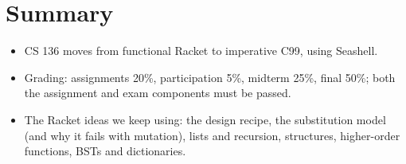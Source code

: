 \section{Summary}
\begin{itemize}
  \item CS 136 moves from functional Racket to imperative C99, using Seashell.
  \item Grading: assignments 20\%, participation 5\%, midterm 25\%, final 50\%; both the
    assignment and exam components must be passed.
  \item The Racket ideas we keep using: the design recipe, the substitution model (and why it
    fails with mutation), lists and recursion, structures, higher-order functions, BSTs and
    dictionaries.
\end{itemize}
